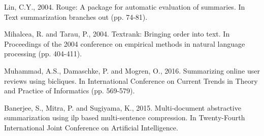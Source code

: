 \documentclass[letterpaper]{article}
\begin{document}
\begin{thebibliography}{}
Lin, C.Y., 2004. Rouge: A package for automatic evaluation of summaries. In Text summarization branches out (pp. 74-81).

Mihalcea, R. and Tarau, P., 2004. Textrank: Bringing order into text. In Proceedings of the 2004 conference on empirical methods in natural language processing (pp. 404-411).

Muhammad, A.S., Damaschke, P. and Mogren, O., 2016. Summarizing online user reviews using bicliques. In International Conference on Current Trends in Theory and Practice of Informatics (pp. 569-579). 

Banerjee, S., Mitra, P. and Sugiyama, K., 2015. Multi-document abstractive summarization using ilp based multi-sentence compression. In Twenty-Fourth International Joint Conference on Artificial Intelligence.

\end{thebibliography}
\end{document}

